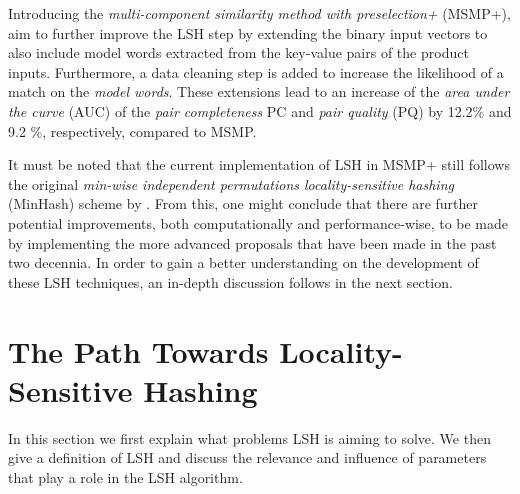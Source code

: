 Introducing the \textit{multi-component similarity method with preselection+} (MSMP+), \cite{HartveldKMNPFS18} aim to further improve the LSH step by extending the binary input vectors to also include model words extracted from the key-value pairs of the product inputs. Furthermore, a data cleaning step is added to increase the likelihood of a match on the \textit{model words}. These extensions lead to an increase of the \textit{area under the curve} (AUC) of the \textit{pair completeness} PC and \textit{pair quality} (PQ) by 12.2\% and 9.2 \%, respectively, compared to MSMP. 

It must be noted that the current implementation of LSH in MSMP+ still follows the original \textit{min-wise independent permutations locality-sensitive hashing} (MinHash) scheme by \cite{Broder00}. From this, one might conclude that there are further potential improvements, both computationally and performance-wise, to be made by implementing the more advanced proposals that have been made in the past two decennia. In order to gain a better understanding on the development of these LSH techniques, an in-depth discussion follows in the next section.

\section{The Path Towards Locality-Sensitive Hashing}
\label{section:lit:introducing_lsh}
In this section we first explain what problems LSH is aiming to solve. We then give a definition of LSH and discuss the relevance and influence of parameters that play a role in the LSH algorithm. 

